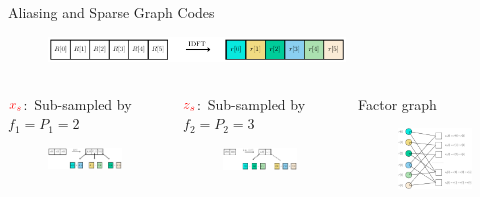 \documentclass[10pt,xcolor=table]{beamer}
\begin{document}
	\begin{frame}{Aliasing and Sparse Graph Codes}
	
		\begin{block}{}
			\begin{figure}[t]
				\centering
				\includegraphics[width=3.1in]{X_DFT}
			\end{figure}
		\end{block}
		
		\begin{columns}
			
			\column{.47\textwidth}
			\begin{block}{{\small $\color{red}x_s$:\ Sub-sampled by $f_1=P_1=2$}}
				\begin{figure}[t]
					\centering
					\includegraphics[width=2.3in]{Xs}
				\end{figure}
			\end{block}
			
			\begin{block}{{\small$\color{red}z_s$:\ Sub-sampled by $f_2=P_2=3$}}
				\begin{figure}[t]
					\centering
					\includegraphics[width=2.3in]{Zs}
				\end{figure}
			\end{block}
			
			\begin{block}{\small Factor graph}
				\begin{figure}[t]
					\centering
					\includegraphics[width=2.3in]{Factorgraph_example}
				\end{figure}
			\end{block}
		\end{columns}
	\end{frame}
	
\end{document}
